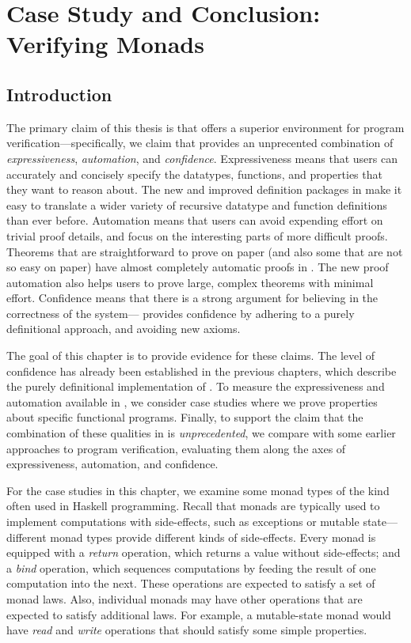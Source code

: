 \chapter{Case Study and Conclusion: Verifying Monads}
\label{ch:case-domain}

\section{Introduction}

The primary claim of this thesis is that  offers a superior environment for program verification---specifically, we claim that  provides an unprecented combination of \emph{expressiveness}, \emph{automation}, and \emph{confidence}.
Expressiveness means that users can accurately and concisely specify the datatypes, functions, and properties that they want to reason about. The new and improved definition packages in  make it easy to translate a wider variety of recursive datatype and function definitions than ever before. Automation means that users can avoid expending effort on trivial proof details, and focus on the interesting parts of more difficult proofs. Theorems that are straightforward to prove on paper (and also some that are not so easy on paper) have almost completely automatic proofs in . The new proof automation also helps users to prove large, complex theorems with minimal effort. Confidence means that there is a strong argument for believing in the correctness of the system--- provides confidence by adhering to a purely definitional approach, and avoiding new axioms.

The goal of this chapter is to provide evidence for these claims. The level of confidence has already been established in the previous chapters, which describe the purely definitional implementation of . To measure the expressiveness and automation available in , we consider case studies where we prove properties about specific functional programs. Finally, to support the claim that the combination of these qualities in  is \emph{unprecedented}, we compare  with some earlier approaches to program verification, evaluating them along the axes of expressiveness, automation, and confidence.

For the case studies in this chapter, we examine some monad types of the kind often used in Haskell programming. Recall that monads are typically used to implement computations with side-effects, such as exceptions or mutable state---different monad types provide different kinds of side-effects. Every monad is equipped with a \emph{return} operation, which returns a value without side-effects; and a \emph{bind} operation, which sequences computations by feeding the result of one computation into the next. These operations are expected to satisfy a set of monad laws. Also, individual monads may have other operations that are expected to satisfy additional laws. For example, a mutable-state monad would have \emph{read} and \emph{write} operations that should satisfy some simple properties.

